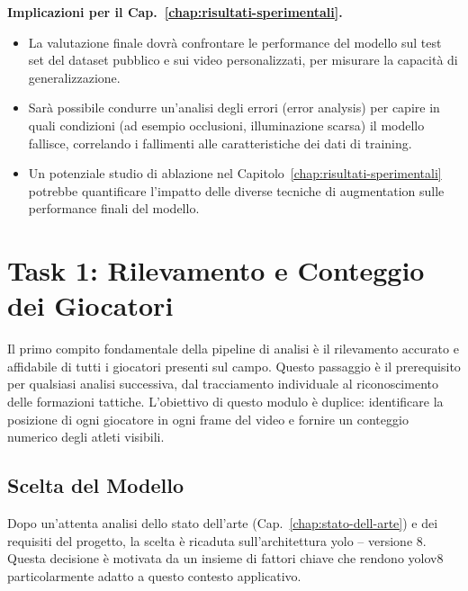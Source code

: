 \documentclass[12pt,a4paper,openright,twoside]{book}
\begin{document}
\textbf{Implicazioni per il Cap.~\ref{chap:risultati-sperimentali}.}
\begin{itemize}
  \item La valutazione finale dovrà confrontare le performance del modello sul test set del dataset pubblico e 
  sui video personalizzati, per misurare la capacità di generalizzazione.
  \item Sarà possibile condurre un'analisi degli errori (error analysis) per capire in quali condizioni 
  (ad esempio occlusioni, illuminazione scarsa) il modello fallisce, correlando i fallimenti alle caratteristiche dei dati 
  di training.
  \item Un potenziale studio di ablazione nel Capitolo~\ref{chap:risultati-sperimentali} potrebbe quantificare 
  l'impatto delle diverse tecniche di augmentation sulle performance finali del modello.
\end{itemize}


\section{Task 1: Rilevamento e Conteggio dei Giocatori}
\label{sec:task-1}

Il primo compito fondamentale della pipeline di analisi è il rilevamento accurato e affidabile di tutti i giocatori presenti sul campo. 
Questo passaggio è il prerequisito per qualsiasi analisi successiva, dal tracciamento individuale al riconoscimento delle formazioni tattiche. 
L'obiettivo di questo modulo è duplice: identificare la posizione di ogni giocatore in ogni frame del video e fornire un conteggio numerico degli 
atleti visibili.

\subsection{Scelta del Modello}
\label{sec:scelta-modello}

Dopo un'attenta analisi dello stato dell'arte (Cap.~\ref{chap:stato-dell-arte}) e dei requisiti del progetto, la scelta è ricaduta 
sull'architettura \acf{yolo} -- versione 8. Questa decisione è motivata da un insieme di fattori chiave che rendono 
\ac{yolo}v8 particolarmente adatto a questo contesto applicativo.
\end{document}
